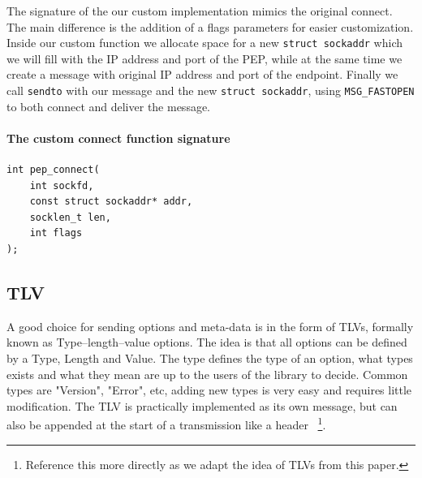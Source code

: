 \documentclass[a4paper,english, 11pt]{report}
\begin{document}
The signature of the our custom implementation mimics the original connect. The main difference is the addition of a flags parameters for easier customization. Inside our custom function we allocate space for a new \verb|struct sockaddr| which we will fill with the IP address and port of the PEP, while at the same time we create a message with original IP address and port of the endpoint. Finally we call \verb|sendto| with our message and the new \verb|struct sockaddr|, using \verb|MSG_FASTOPEN| to both connect and deliver the message.\\

\noindent\begin{minipage}{\linewidth}
\paragraph{The custom connect function signature}
\begin{verbatim}
int pep_connect(
    int sockfd,
    const struct sockaddr* addr,
    socklen_t len,
    int flags
);
\end{verbatim}
\end{minipage}


%
%    
%
%    
%

\subsection{TLV}
A good choice for sending options and meta-data is in the form of TLVs, formally known as Type–length–value options.
The idea is that all options can be defined by a Type, Length and Value. The type defines the type of an option, what types exists and what they mean are up to the users of the library to decide. Common types are "Version", "Error", etc, adding new types is very easy and requires little modification. The TLV is practically implemented as its own message, but can also be appended at the start of a transmission like a header ~\cite{rfc8803}\footnote{Reference this more directly as we adapt the idea of TLVs from this paper.}.\\
\end{document}
